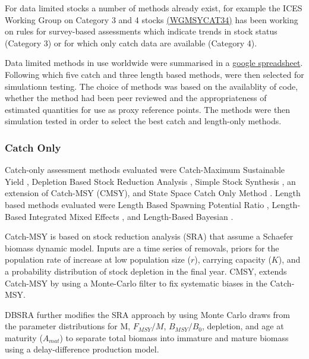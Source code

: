 For data limited stocks a number of methods already exist, for example the ICES Working Group on Category 3 and 4 stocks \href{ 
http://www.ices.dk/sites/pub/Publication Reports/Expert Group Report/acom/2017/WKMSYCAT34/01 WKMSYCAT34 REPORT 2017.pdf}{(WGMSYCAT34)} has been working on rules for survey-based assessments which indicate trends in stock status (Category 3) or for which only catch data are available (Category 4). 

Data limited methods in use worldwide were summarised in a \href{https://docs.google.com/spreadsheets/d/17_qQdzDY41ZrL0yT6QtHpUR4_ydxx_xfCh4GiDqYymU/edit?usp=sharing}{google spreadsheet}. Following which five catch and three length based methods, were then selected for simulationn testing. The choice of methods was based on the availablity of code, whether the method had been peer reviewed and the appropriateness of estimated quantities for use as proxy reference points. The methods were then simulation tested \citep{pons2019catchlen} in order to select the best catch and length-only methods.


\subsubsection*{Catch Only}

Catch-only assessment methods evaluated were Catch-Maximum Sustainable Yield \citep[Catch-MSY][]{martell2013simple}, Depletion Based  Stock Reduction Analysis \citep[DBSRA][]{dick2011depletion}, Simple Stock Synthesis \citep[SSS][]{cope2013implementing}, an extension of Catch-MSY (CMSY), and State Space Catch Only Method \citep[SSCOM][]{thorson2015catch}. Length based methods evaluated were Length Based Spawning Potential Ratio \citep[LBSPR][]{hordyk2014novel,hordyk2015evaluation}, Length-Based Integrated Mixed Effects \citep[LIME][]{rudd2017accounting}, and Length-Based Bayesian \citep[LBB][]{froese2018new}.

Catch-MSY  is based on stock reduction analysis (SRA) that assume a Schaefer biomass dynamic model. Inputs are a time series of removals, priors for the population rate of increase at low population size ($r$), carrying capacity ($K$), and a probability distribution of stock depletion in the final year. CMSY, extends Catch-MSY by using a Monte-Carlo filter to fix systematic biases in the Catch-MSY. 

DBSRA further modifies the SRA approach by using Monte Carlo draws from the parameter distributions for M, $F_{MSY}/M$, $B_{MSY}/B_0$, depletion, and age at maturity ($A_{mat}$) to separate total biomass into immature and mature biomass using a delay-difference production model. 

